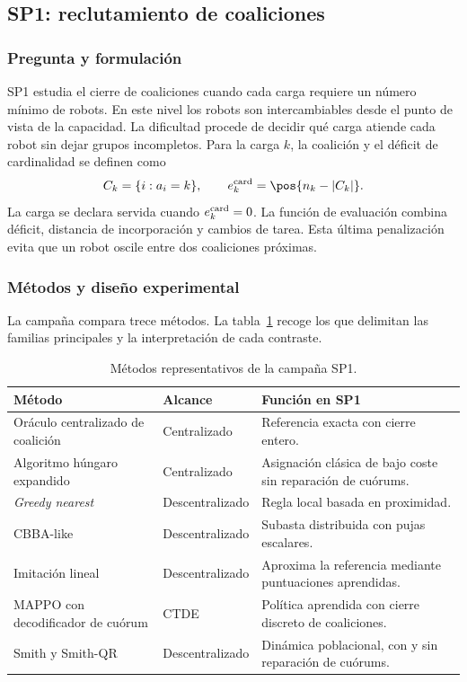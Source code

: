 \clearpage
\subsection{SP1: reclutamiento de coaliciones}
\label{sec:resultados-sp1}

\subsubsection{Pregunta y formulación}

SP1 estudia el cierre de coaliciones cuando cada carga requiere un número mínimo de robots. En este nivel los robots son intercambiables desde el punto de vista de la capacidad. La dificultad procede de decidir qué carga atiende cada robot sin dejar grupos incompletos. Para la carga $k$, la coalición y el déficit de cardinalidad se definen como
\[
 C_k=\{i:a_i=k\}, \qquad e_k^{\rm card}=\pos{n_k-|C_k|}.
\]
La carga se declara servida cuando $e_k^{\rm card}=0$. La función de evaluación combina déficit, distancia de incorporación y cambios de tarea. Esta última penalización evita que un robot oscile entre dos coaliciones próximas.



\subsubsection{Métodos y diseño experimental}

La campaña compara trece métodos. La tabla~\ref{tab:sp1-methods} recoge los que delimitan las familias principales y la interpretación de cada contraste.

\begin{table}[H]
\centering
\scriptsize
\begin{tabularx}{\textwidth}{@{}p{}p{}X@{}}
\toprule
Método & Alcance & Función en SP1 \\
\midrule
Oráculo centralizado de coalición & Centralizado & Referencia exacta con cierre entero. \\
Algoritmo húngaro expandido & Centralizado & Asignación clásica de bajo coste sin reparación de cuórums. \\
\emph{Greedy nearest} & Descentralizado & Regla local basada en proximidad. \\
CBBA-like & Descentralizado & Subasta distribuida con pujas escalares. \\
Imitación lineal & Descentralizado & Aproxima la referencia mediante puntuaciones aprendidas. \\
MAPPO con decodificador de cuórum & CTDE & Política aprendida con cierre discreto de coaliciones. \\
Smith y Smith-QR & Descentralizado & Dinámica poblacional, con y sin reparación de cuórums. \\
\bottomrule
\end{tabularx}
\caption{Métodos representativos de la campaña SP1.}
\label{tab:sp1-methods}
\end{table}

